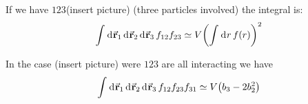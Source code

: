 \documentclass[../main/main.tex]{subfiles}
\begin{document}
If we have \( 123 \)(insert picture) (three particles involved) the integral is:
\begin{equation}
  \int_{}^{} \dd[]{\va{r}_1}  \dd[]{\va{r}_2}   \dd[]{\va{r}_3}  f_{12} f_{23}
  \simeq V  \qty(  \int_{}^{} \dd[]{r} f(r)  )^2
\end{equation}

In the case (insert picture) were \( 123 \) are all interacting we have
\begin{equation}
  \int_{}^{} \dd[]{\va{r}_1}  \dd[]{\va{r}_2}   \dd[]{\va{r}_3}  f_{12} f_{23} f_{31}
  \simeq V  \qty( b_3 - 2 b_2^2  )
\end{equation}
\end{document}

